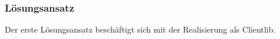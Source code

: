 \subsubsection{Lösungsansatz }
\label{sec:sol_clientlib}

Der erste Lösungsansatz beschäftigt sich mit der Realisierung als Clientlib.

%


